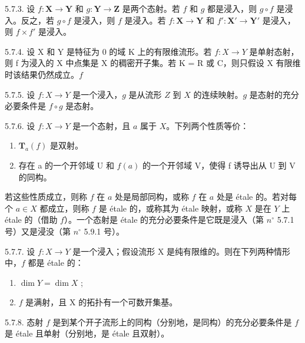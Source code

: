 5.7.3. 设 \(f: \mathbf{X} \to \mathbf{Y}\) 和 \(g: \mathbf{Y} \to \mathbf{Z}\) 是两个态射。若 \(f\) 和 \(g\) 都是浸入，则 \(g \circ f\) 是浸入。反之，若 \(g \circ f\) 是浸入，则 \(f\) 是浸入。若 \(f: \mathbf{X} \to \mathbf{Y}\) 和 \(f': \mathbf{X}' \to \mathbf{Y}'\) 是浸入，则 \(f \times f'\) 是浸入。

5.7.4. 设 X 和 Y 是特征为 0 的域 K 上的有限维流形。若 \(f:X\to Y\) 是单射态射，则 f 为浸入的 X 中点集是 X 的稠密开子集。若 K = R 或 C，则只假设 X 有限维时该结果仍然成立。\(f\)

5.7.5. 设 \(f:X\to Y\) 是一个浸入，\(g\) 是从流形 \(Z\) 到 \(X\) 的连续映射。\(g\) 是态射的充分必要条件是 \(f\circ g\) 是态射。

5.7.6. 设 \(f: X \to Y\) 是一个态射，且 \(a\) 属于 \(X\)。下列两个性质等价：

\begin{enumerate}
\def\labelenumi{(\roman{enumi})}
\item
  \(\mathbf{T}_{a}(f)\) 是双射。
\item
  存在 a 的一个开邻域 U 和 \(f(a)\) 的一个开邻域 V，使得 f 诱导出从 U 到 V 的同构。
\end{enumerate}

若这些性质成立，则称 \(f\) 在 \(a\) 处是局部同构，或称 \(f\) 在 \(a\) 处是 étale 的。若对每个 \(a \in X\) 都成立，则称 \(f\) 是 étale 的，或称其为 étale 映射，或称 \(X\) 是在 \(Y\) 上 étale 的（借助 \(f\)）。一个态射是 étale 的充分必要条件是它既是浸入（第 \(n^{\circ}\) 5.7.1 号）又是浸没（第 \(n^{\circ}\) 5.9.1 号）。

5.7.7. 设 \(f:X\to Y\) 是一个浸入；假设流形 X 是纯有限维的。则在下列两种情形中，\(f\) 都是 étale 的：

\begin{enumerate}
\def\labelenumi{(\roman{enumi})}
\item
  \(\dim Y = \dim X\) ;
\item
  \(f\) 是满射，且 X 的拓扑有一个可数开集基。
\end{enumerate}

5.7.8. 态射 \(f\) 是到某个开子流形上的同构（分别地，是同构）的充分必要条件是 \(f\) 是 étale 且单射（分别地，是 étale 且双射）。

